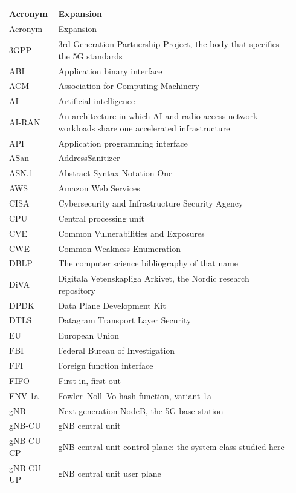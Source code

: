 \documentclass[english,oneside,a4paper,censored,csm,software-track-2020]{HYthesisML}
\renewcommand{\arraystretch}{0.95}
\begin{document}
\begingroup
\singlespacing
\footnotesize
\renewcommand{\arraystretch}{1.15}
\begin{longtable}{@{}p{0.15\linewidth} p{0.79\linewidth}@{}}
\hline\hline
Acronym & Expansion \\
\hline
\endfirsthead
\hline\hline
Acronym & Expansion \\
\hline
\endhead
3GPP & 3rd Generation Partnership Project, the body that specifies the 5G standards \\
ABI & Application binary interface \\
ACM & Association for Computing Machinery \\
AI & Artificial intelligence \\
AI-RAN & An architecture in which AI and radio access network workloads share one accelerated infrastructure \\
API & Application programming interface \\
ASan & AddressSanitizer \\
ASN.1 & Abstract Syntax Notation One \\
AWS & Amazon Web Services \\
CISA & Cybersecurity and Infrastructure Security Agency \\
CPU & Central processing unit \\
CVE & Common Vulnerabilities and Exposures \\
CWE & Common Weakness Enumeration \\
DBLP & The computer science bibliography of that name \\
DiVA & Digitala Vetenskapliga Arkivet, the Nordic research repository \\
DPDK & Data Plane Development Kit \\
DTLS & Datagram Transport Layer Security \\
EU & European Union \\
FBI & Federal Bureau of Investigation \\
FFI & Foreign function interface \\
FIFO & First in, first out \\
FNV-1a & Fowler--Noll--Vo hash function, variant 1a \\
gNB & Next-generation NodeB, the 5G base station \\
gNB-CU & gNB central unit \\
gNB-CU-CP & gNB central unit control plane: the system class studied here \\
gNB-CU-UP & gNB central unit user plane \\

\end{longtable}
\end{document}
